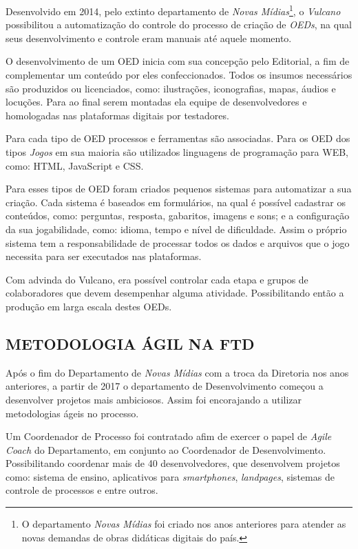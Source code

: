 \documentclass[
  12pt,				%
  openany,
  oneside,
  a4paper,			%
  english,			%
  brazil
]{article}
\numberwithin{figure}{section}
\numberwithin{table}{section}
\begin{document}
Desenvolvido em 2014, pelo extinto departamento de \textit{Novas Mídias}\footnote{O departamento \textit{Novas Mídias} foi criado nos anos anteriores para atender as novas demandas de obras didáticas digitais do país.}, o \textit{Vulcano} possibilitou a automatização do controle do processo de criação de \textit{OEDs}, na qual seus desenvolvimento e controle eram manuais até aquele momento. 

O desenvolvimento de um OED inicia com sua concepção pelo Editorial, a fim de complementar um conteúdo por eles confeccionados. Todos os insumos necessários são produzidos ou licenciados, como: ilustrações, iconografias, mapas, áudios e locuções. Para ao final serem montadas ela equipe de desenvolvedores e homologadas nas plataformas digitais por testadores.

Para cada tipo de OED processos e ferramentas são associadas. Para os OED dos tipos \textit{Jogos} em sua maioria são utilizados linguagens de programação para WEB, como: HTML, JavaScript e CSS.

Para esses tipos de OED foram criados pequenos sistemas para automatizar a sua criação. Cada sistema é baseados em formulários, na qual é possível cadastrar os conteúdos, como: perguntas, resposta, gabaritos, imagens e sons; e a configuração da sua jogabilidade, como: idioma, tempo e nível de dificuldade. Assim o próprio sistema tem a responsabilidade de processar todos os dados e arquivos que o jogo necessita para ser executados nas plataformas.

Com advinda do Vulcano, era possível controlar cada etapa e grupos de colaboradores que devem desempenhar alguma atividade. Possibilitando então a produção em larga escala destes OEDs.


\subsection{METODOLOGIA ÁGIL NA FTD}

Após o fim do Departamento de \textit{Novas Mídias} com a troca da Diretoria nos anos anteriores, a partir de 2017 o departamento de Desenvolvimento começou a desenvolver projetos mais ambiciosos. Assim foi encorajando a utilizar metodologias ágeis no processo.

Um Coordenador de Processo foi contratado afim de exercer o papel de \textit{Agile Coach} do Departamento, em conjunto ao Coordenador de Desenvolvimento. Possibilitando coordenar mais de 40 desenvolvedores, que desenvolvem projetos como: sistema de ensino, aplicativos para \textit{smartphones}, \textit{landpages}, sistemas de controle de processos e entre outros.
\end{document}
